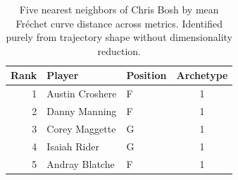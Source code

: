 \begin{table}[htbp]
  \centering\small
  \begin{tabular}{rllc}
    \toprule
    Rank & Player & Position & Archetype \\
    \midrule
    1 & Austin Croshere & F & 1 \\
    2 & Danny Manning & F & 1 \\
    3 & Corey Maggette & G & 1 \\
    4 & Isaiah Rider & G & 1 \\
    5 & Andray Blatche & F & 1 \\
    \bottomrule
  \end{tabular}
  \caption{Five nearest neighbors of Chris Bosh by mean Fr\'{e}chet curve distance across metrics. Identified purely from trajectory shape without dimensionality reduction.}
  \label{tab:Chris_Bosh_frechet_curve_neighbors}
\end{table}

